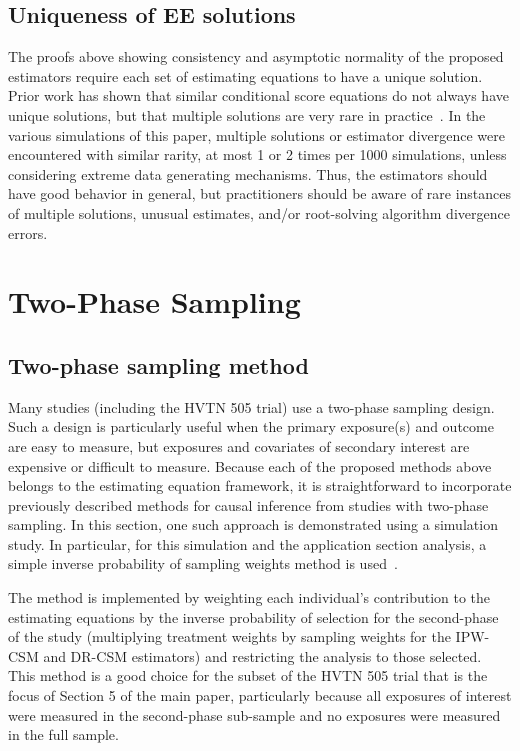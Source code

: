 \documentclass[12pt]{article}
\begin{document}
\subsection{Uniqueness of EE solutions}

The proofs above showing consistency and asymptotic normality of the proposed estimators require each set of estimating equations to have a unique solution. Prior work has shown that similar conditional score equations do not always have unique solutions, but that multiple solutions are very rare in practice~\citep{stefanski1987}. In the various simulations of this paper, multiple solutions or estimator divergence were encountered with similar rarity, at most 1 or 2 times per 1000 simulations, unless considering extreme data generating mechanisms. Thus, the estimators should have good behavior in general, but practitioners should be aware of rare instances of multiple solutions, unusual estimates, and/or root-solving algorithm divergence errors.

\section{Two-Phase Sampling}

\subsection{Two-phase sampling method}

Many studies (including the HVTN 505 trial) use a two-phase sampling design. Such a design is particularly useful when the primary exposure(s) and outcome are easy to measure, but exposures and covariates of secondary interest are expensive or difficult to measure. Because each of the proposed methods above belongs to the estimating equation framework, it is straightforward to incorporate previously described methods for causal inference from studies with two-phase sampling. In this section, one such approach is demonstrated using a simulation study. In particular, for this simulation and the application section analysis, a simple inverse probability of sampling weights method is used~\citep{wang2009}.

The method is implemented by weighting each individual's contribution to the estimating equations by the inverse probability of selection for the second-phase of the study (multiplying treatment weights by sampling weights for the IPW-CSM and DR-CSM estimators) and restricting the analysis to those selected. This method is a good choice for the subset of the HVTN 505 trial that is the focus of Section 5 of the main paper, particularly because all exposures of interest were measured in the second-phase sub-sample and no exposures were measured in the full sample.
\end{document}
